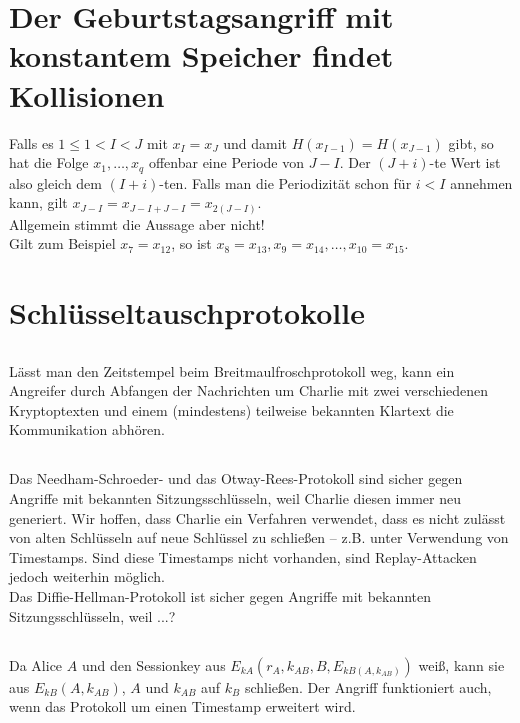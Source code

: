 \documentclass{../crypto}
\begin{document}
\section{Der Geburtstagsangriff mit konstantem Speicher findet Kollisionen}
Falls es $1 \le 1 < I < J$ mit $x_I = x_J$ und damit $H(x_{I-1}) = H(x_{J-1})$ gibt, so hat die Folge $x_1,\ldots,x_q$ offenbar eine Periode von $J - I$. Der $(J+i)$-te Wert ist also gleich dem $(I+i)$-ten. Falls man die Periodizität schon für $i < I$ annehmen kann, gilt $x_{J-I} = x_{J-I + J-I} = x_{2(J-I)}$.\\
Allgemein stimmt die Aussage aber nicht!\\
Gilt zum Beispiel $x_7 = x_{12}$, so ist $x_8 = x_{13}, x_9 = x_{14},\ldots,x_{10} = x_{15}$.

\section{Schlüsseltauschprotokolle}
\subsection{}
Lässt man den Zeitstempel beim Breitmaulfroschprotokoll weg, kann ein Angreifer durch Abfangen der Nachrichten um Charlie mit zwei verschiedenen Kryptoptexten und einem (mindestens) teilweise bekannten Klartext die Kommunikation abhören.

\subsection{}
Das Needham-Schroeder- und das Otway-Rees-Protokoll sind sicher gegen Angriffe mit bekannten Sitzungsschlüsseln, weil Charlie diesen immer neu generiert. Wir hoffen, dass Charlie ein Verfahren verwendet, dass es nicht zulässt von alten Schlüsseln auf neue Schlüssel zu schließen -- z.B.  unter Verwendung von Timestamps. Sind diese Timestamps nicht vorhanden, sind Replay-Attacken jedoch weiterhin möglich.\\
Das Diffie-Hellman-Protokoll ist sicher gegen Angriffe mit bekannten Sitzungsschlüsseln, weil ...?

\subsection{}
Da Alice $A$ und den Sessionkey aus $E_{kA}(r_A,k_{AB},B,E_{kB(A,k_{AB})})$ weiß, kann sie aus $E_{kB}(A,k_{AB})$, $A$ und $k_{AB}$ auf $k_B$ schließen. Der Angriff funktioniert auch, wenn das Protokoll um einen Timestamp erweitert wird.
\end{document}

